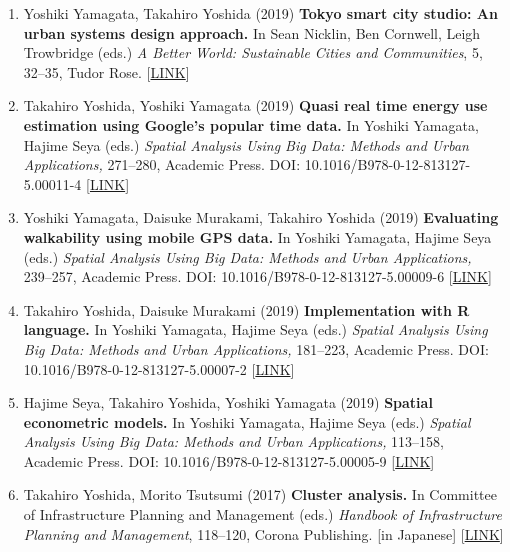 \documentclass[
]{book}
\begin{document}
\begin{enumerate}
\item
  Yoshiki Yamagata, Takahiro Yoshida (2019)
  \textbf{Tokyo smart city studio: An urban systems design approach.}
  In Sean Nicklin, Ben Cornwell, Leigh Trowbridge (eds.)
  \emph{A Better World: Sustainable Cities and Communities}, 5, 32--35, Tudor Rose.
  {[}\href{http://unhabitat.org.mm/publications/a-better-world-volume-5/}{LINK}{]}
\item
  Takahiro Yoshida, Yoshiki Yamagata (2019)
  \textbf{Quasi real time energy use estimation using Google's popular time data.}
  In Yoshiki Yamagata, Hajime Seya (eds.)
  \emph{Spatial Analysis Using Big Data: Methods and Urban Applications,} 271--280, Academic Press.
  DOI: 10.1016/B978-0-12-813127-5.00011-4 {[}\href{https://www.elsevier.com/books/spatial-analysis-using-big-data/yamagata/978-0-12-813127-5}{LINK}{]}
\item
  Yoshiki Yamagata, Daisuke Murakami, Takahiro Yoshida (2019)
  \textbf{Evaluating walkability using mobile GPS data.}
  In Yoshiki Yamagata, Hajime Seya (eds.)
  \emph{Spatial Analysis Using Big Data: Methods and Urban Applications,} 239--257, Academic Press.
  DOI: 10.1016/B978-0-12-813127-5.00009-6 {[}\href{https://www.elsevier.com/books/spatial-analysis-using-big-data/yamagata/978-0-12-813127-5}{LINK}{]}
\item
  Takahiro Yoshida, Daisuke Murakami (2019)
  \textbf{Implementation with R language.}
  In Yoshiki Yamagata, Hajime Seya (eds.)
  \emph{Spatial Analysis Using Big Data: Methods and Urban Applications,} 181--223, Academic Press.
  DOI: 10.1016/B978-0-12-813127-5.00007-2 {[}\href{https://www.elsevier.com/books/spatial-analysis-using-big-data/yamagata/978-0-12-813127-5}{LINK}{]}
\item
  Hajime Seya, Takahiro Yoshida, Yoshiki Yamagata (2019)
  \textbf{Spatial econometric models.}
  In Yoshiki Yamagata, Hajime Seya (eds.)
  \emph{Spatial Analysis Using Big Data: Methods and Urban Applications,} 113--158, Academic Press.
  DOI: 10.1016/B978-0-12-813127-5.00005-9 {[}\href{https://www.elsevier.com/books/spatial-analysis-using-big-data/yamagata/978-0-12-813127-5}{LINK}{]}
\item
  Takahiro Yoshida, Morito Tsutsumi (2017)
  \textbf{Cluster analysis.}
  In Committee of Infrastructure Planning and Management (eds.)
  \emph{Handbook of Infrastructure Planning and Management}, 118--120, Corona Publishing.
  {[}in Japanese{]} {[}\href{http://www.coronasha.co.jp/doboku-hb.html}{LINK}{]}
\end{enumerate}
\end{document}
